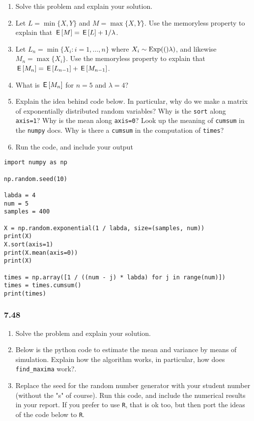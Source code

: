 \documentclass[assignments]{subfiles}
\begin{document}
\begin{enumerate}
\item Solve this problem and explain your solution.
\item Let \(L=\min\{X,Y\}\) and \(M=\max\{X,Y\}\). Use the memoryless property to explain that \(\,\mathsf{E}\left[M\right] = \,\mathsf{E}\left[L\right] + 1/\lambda\).
\item Let \(L_{n}=\min\{X_{i} : i = 1,\ldots, n\}\) where \(X_i\sim \mathrm{Exp}(()\lambda)\), and likewise  \(M_{n}=\max\{X_i\}\). Use the memoryless property to explain that \(\,\mathsf{E}\left[M_{n}\right] = \,\mathsf{E}\left[L_{n-1}\right] + \,\mathsf{E}\left[M_{n-1}\right]\).
\item What is \(\,\mathsf{E}\left[M_n\right]\) for \(n=5\) and \(\lambda = 4\)?
\item Explain the idea behind code below. In particular, why do we make a matrix of exponentially distributed random variables? Why is the \texttt{sort} along \texttt{axis=1}? Why is the mean along \texttt{axis=0}? Look up the meaning of \texttt{cumsum} in the \texttt{numpy} docs. Why is there a \texttt{cumsum} in the computation of \texttt{times}?
\item Run the code, and include your output
\end{enumerate}


\begin{verbatim}
import numpy as np

np.random.seed(10)

labda = 4
num = 5
samples = 400

X = np.random.exponential(1 / labda, size=(samples, num))
print(X)
X.sort(axis=1)
print(X.mean(axis=0))
print(X)

times = np.array([1 / ((num - j) * labda) for j in range(num)])
times = times.cumsum()
print(times)
\end{verbatim}




\subsubsection{7.48}
\label{sec:org56d10c5}
\begin{enumerate}
\item Solve  the problem and explain your solution.
\item Below is the python code to estimate the mean and variance by means of simulation.   Explain how the algorithm works, in particular, how does \texttt{find\_maxima} work?.
\item Replace the seed for the random number generator with your student number (without the "s" of course). Run this code, and include the numerical results in your report. If you prefer to use \texttt{R}, that is ok too, but then port the ideas of the code below to \texttt{R}.
\end{enumerate}
\end{document}
